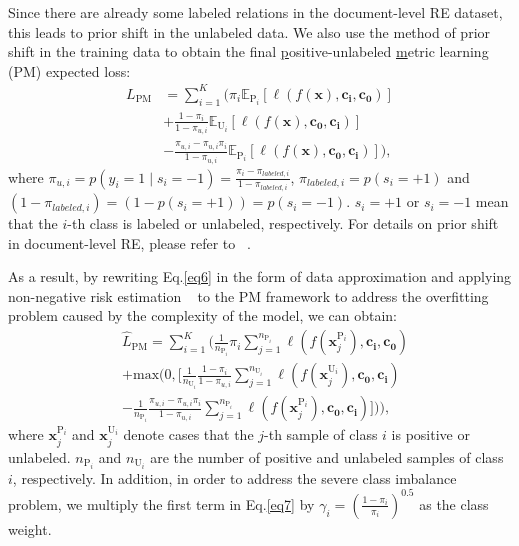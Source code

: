 \documentclass[letterpaper]{article} %
\begin{document}
Since there are already some labeled relations in the document-level RE dataset, this leads to prior shift in the unlabeled data. We also use the method of prior shift in the training data to obtain the final \underline{p}ositive-unlabeled \underline{m}etric learning (PM) expected loss:
\begin{equation}
\begin{aligned}\label{eq6}
L_{\mathrm{PM}}&=\sum_{i=1}^{K}(\pi_{i} \mathbb{E}_{\mathrm{P}_{i}}[ \ell(f(\boldsymbol{x}), \boldsymbol{c_{i}}, \boldsymbol{c_{0}})] \\
&+\frac{1-\pi_{i}}{1-\pi_{u,i}} \mathbb{E}_{\mathrm{U}_{i}}[\ell(f(\boldsymbol{x}), \boldsymbol{c_{0}}, \boldsymbol{c_{i}})] \\
&-\frac{\pi_{u,i}-\pi_{u,i} \pi_{i}}{1-\pi_{u,i}}\mathbb{E}_{\mathrm{P}_{i}}[\ell(f(\boldsymbol{x}), \boldsymbol{c_{0}}, \boldsymbol{c_{i}})]),
\end{aligned}
\end{equation}
where $\pi_{u,i}=p(y_{i}=1 \mid s_{i}=-1)=\frac{\pi_{i}-\pi_{labeled,i}}{1-\pi_{labeled,i}}$, $\pi_{labeled,i}=p(s_{i}=+1)$ and $(1-\pi_{labeled,i})=(1-p(s_{i}=+1))=p(s_{i}=-1)$. $s_{i}=+1$ or $s_{i}=-1$ mean that the $i$-th class is labeled or unlabeled, respectively. For details on prior shift in document-level RE, please refer to ~\cite{DBLP:conf/emnlp/WangLHZ22}.

As a result, by rewriting Eq.\ref{eq6} in the form of data approximation and applying non-negative risk estimation ~\cite{DBLP:conf/nips/KiryoNPS17} to the PM framework to address the overfitting problem caused by the complexity of the model, we can obtain:
\begin{equation}
\begin{aligned}\label{eq7}
&\widehat{L}_{\mathrm{PM}}=\sum_{i=1}^{K}( \frac{1}{n_{\mathrm{P}_{i}}}\pi_{i} \sum_{j=1}^{n_{\mathrm{P}_{i}}}\ell(f(\boldsymbol{x}_{j}^{\mathrm{P}_{i}}), \boldsymbol{c_{i}}, \boldsymbol{c_{0}}) \\&+\mathrm{max}(0, [\frac{1}{n_{\mathrm{U}_{i}}} \frac{1-\pi_{i}}{1-\pi_{u,i}} \sum_{j=1}^{n_{\mathrm{U}_{i}}} \ell(f(\boldsymbol{x}_{j}^{\mathrm{U}_{i}}), \boldsymbol{c_{0}}, \boldsymbol{c_{i}})\\&-\frac{1}{n_{\mathrm{P}_{i}}}\frac{\pi_{u,i}-\pi_{u,i} \pi_{i}}{1-\pi_{u,i}} \sum_{j=1}^{n_{\mathrm{P}_{i}}}\ell(f(\boldsymbol{x}_{j}^{\mathrm{P}_{i}}), \boldsymbol{c_{0}}, \boldsymbol{c_{i}})])),
\end{aligned}
\end{equation}
where $\boldsymbol{x}_{j}^{\mathrm{P}_{i}}$ and $\boldsymbol{x}_{j}^{\mathrm{U}_{i}}$ denote cases that the $j$-th sample of class $i$ is positive or unlabeled. $n_{\mathrm{P}_{i}}$ and $n_{\mathrm{U}_{i}}$ are the number of positive and unlabeled samples of class $i$, respectively. In addition, in order to address the severe class imbalance problem, we multiply the first term in Eq.\ref{eq7} by $\gamma_{i}=(\frac{1-\pi_{i}}{\pi_{i}})^{0.5}$ as the class weight.
\end{document}
